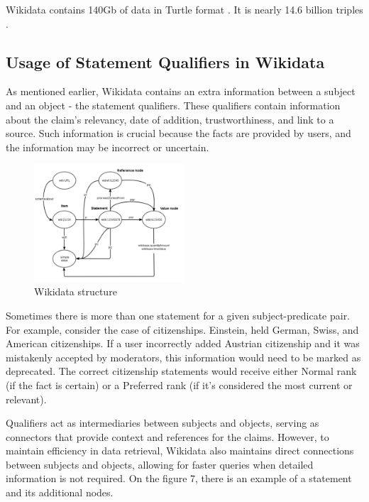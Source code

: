 Wikidata contains 140Gb of data in Turtle format \citep{malyshev2018getting}. It is nearly 14.6 billion triples \citep{rdfhdt}.
\subsection{Usage of Statement Qualifiers in Wikidata}

As mentioned earlier, Wikidata contains an extra information between a subject and an object - the statement qualifiers. These qualifiers contain information about the claim's relevancy, date of addition, trustworthiness, and link to a source. Such information is crucial because the facts are provided by users, and the information may be incorrect or uncertain.

\begin{figure}[htbp]
    \centering
    \includegraphics[width=0.5\textwidth]{7.png}
    \caption{Wikidata structure \citep{oxfordsemantic2023wikidata}}
    \label{fig:image7}
\end{figure}

Sometimes there is more than one statement for a given subject-predicate pair. For example, consider the case of citizenships. Einstein, held German, Swiss, and American citizenships. If a user incorrectly added Austrian citizenship and it was mistakenly accepted by moderators, this information would need to be marked as deprecated. The correct citizenship statements would receive either Normal rank (if the fact is certain) or a Preferred rank (if it's considered the most current or relevant).

Qualifiers act as intermediaries between subjects and objects, serving as connectors that provide context and references for the claims. However, to maintain efficiency in data retrieval, Wikidata also maintains direct connections between subjects and objects, allowing for faster queries when detailed information is not required. On the figure 7, there is an example of a statement and its additional nodes. 

